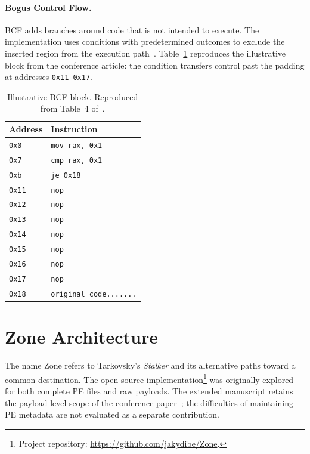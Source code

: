 \documentclass[runningheads]{llncs}
\begin{document}
\paragraph{Bogus Control Flow.}
BCF adds branches around code that is not intended to execute. The implementation uses conditions with predetermined outcomes to exclude the inserted region from the execution path~\cite{bin2binobf,llvmobf}. Table~\ref{table:bcf_code} reproduces the illustrative block from the conference article: the condition transfers control past the padding at addresses \texttt{0x11}--\texttt{0x17}.

\begin{table}[t]
\caption{Illustrative BCF block. Reproduced from Table~4 of~\cite{zone_secrypt_2026}.}
\small
\centering
\setlength{\tabcolsep}{3pt}
\label{table:bcf_code}
\begin{tabular}{ll}
    \hline
    \textbf{Address}    & \textbf{Instruction} \\ \hline

    \verb|0x0|  & 	\verb|mov rax, 0x1|  \\ \hline
    \verb|0x7|	&   \verb|cmp rax, 0x1|  \\ \hline
    \verb|0xb| 	&   \verb|je 0x18|  \\ \hline
    \verb|0x11|	&   \verb|nop|  \\ \hline
    \verb|0x12|	&   \verb|nop|  \\ \hline
    \verb|0x13|	&   \verb|nop|  \\ \hline
    \verb|0x14|	&   \verb|nop|  \\ \hline
    \verb|0x15|	&   \verb|nop|  \\ \hline
    \verb|0x16|	&   \verb|nop|  \\ \hline
    \verb|0x17|	&   \verb|nop|  \\ \hline
    \verb|0x18|	&\verb|original code.......|    \\ \hline
\end{tabular}
\end{table}


\section{Zone Architecture}\label{sec:developing_meth}
The name Zone refers to Tarkovsky's \emph{Stalker} and its alternative paths toward a common destination. The open-source implementation\footnote{Project repository: \url{https://github.com/jakydibe/Zone}.} was originally explored for both complete PE files and raw payloads. The extended manuscript retains the payload-level scope of the conference paper~\cite{zone_secrypt_2026}; the difficulties of maintaining PE metadata are not evaluated as a separate contribution.
\end{document}
